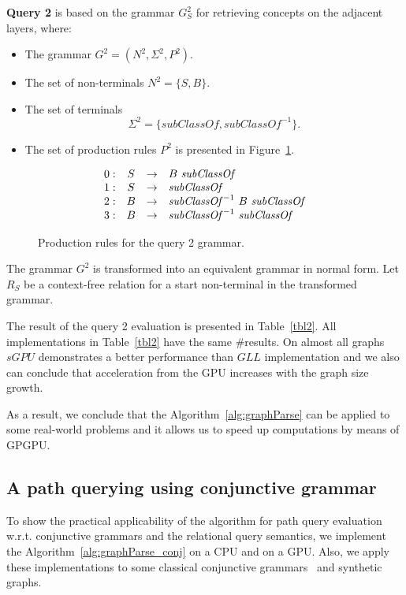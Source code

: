 \textbf{Query 2} is based on the grammar $G^2_S$ for retrieving concepts on the adjacent layers, where:
\begin{itemize}
    \item The grammar $G^2 = (N^2, \Sigma^2, P^2)$.
    \item The set of non-terminals $N^2 = \{S, B\}$.
    \item The set of terminals $$\Sigma^2 = \{subClassOf, subClassOf^{-1}\}.$$
    \item The set of production rules $P^2$ is presented in Figure~\ref{ProductionRulesQuery2}.
\end{itemize}

\begin{figure}[h]
   \[
\begin{array}{rccl}
   0: & S & \rightarrow & B \ \text{\textit{subClassOf}} \\ 
   1: & S & \rightarrow & \text{\textit{subClassOf}} \\ 
   2: & B & \rightarrow & \text{\textit{subClassOf}}^{-1} \ B \ \text{\textit{subClassOf}} \\ 
   3: & B & \rightarrow & \text{\textit{subClassOf}}^{-1} \ \text{\textit{subClassOf}} \\ 
\end{array}
\]
\caption{Production rules for the query 2 grammar.}
\label{ProductionRulesQuery2}
\end{figure}

The grammar $G^2$ is transformed into an equivalent grammar in normal form. Let $R_S$ be a context-free relation for a start non-terminal in the transformed grammar.

The result of the query 2 evaluation is presented in Table~\ref{tbl2}. All implementations in Table~\ref{tbl2} have the same \#results. On almost all graphs $sGPU$ demonstrates a better performance than $GLL$ implementation and we also can conclude that acceleration from the GPU increases with the graph size growth.

As a result, we conclude that the Algorithm~\ref{alg:graphParse} can be applied to some real-world problems and it allows us to speed up computations by means of GPGPU.

\subsection{A path querying using conjunctive grammar}

To show the practical applicability of the algorithm for path query evaluation w.r.t. conjunctive grammars and the relational query semantics, we implement the Algorithm~\ref{alg:graphParse_conj} on a CPU and on a GPU. Also, we apply these implementations to some classical conjunctive grammars~\cite{okhotin2001conjunctive} and synthetic graphs.

